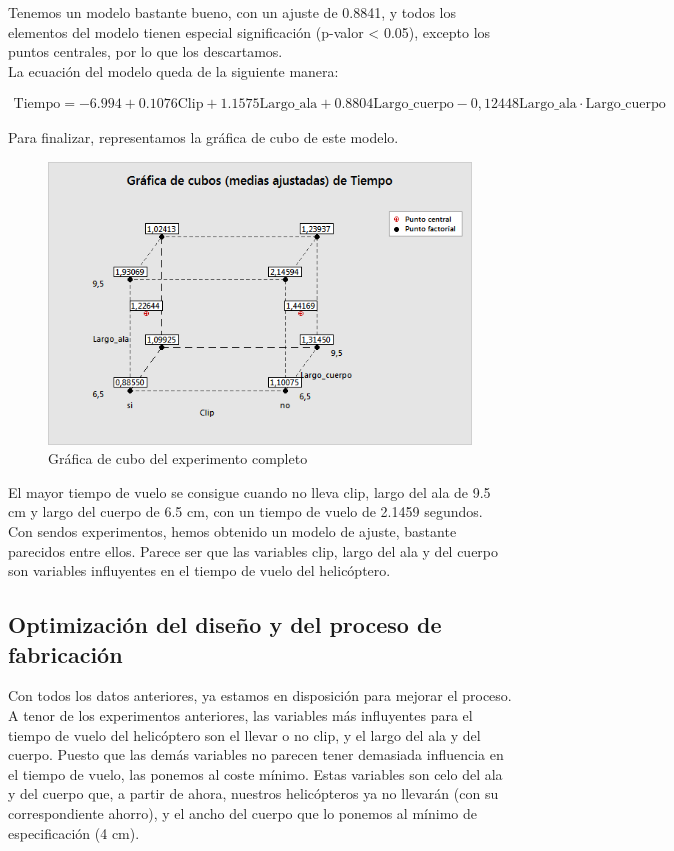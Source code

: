 \documentclass[12pt,a4paper,twoside,openright,titlepage,final]{article}
\begin{document}
Tenemos un modelo bastante bueno, con un ajuste de 0.8841, y todos los elementos del modelo tienen especial significación (p-valor < 0.05), excepto los puntos centrales, por lo que los descartamos.\\

La ecuación del modelo queda de la siguiente manera:

\begin{multline*}
\text{Tiempo} = -6.994 + 0.1076 \text{Clip} + 1.1575 \text{Largo\_ala} + 0.8804 \text{Largo\_cuerpo} - 0,12448 \text{Largo\_ala}\cdot \text{Largo\_cuerpo}
\end{multline*}

Para finalizar, representamos la gráfica de cubo de este modelo.\\

\begin{figure}[htbp!]
	\centering
	\includegraphics[width=0.7\linewidth]{imagenes/Experimento_completo/Grafica_de_cubos_(medias_ajustadas)_de_Tiempo}
	\caption{Gráfica de cubo del experimento completo}
	\label{fig:cubo_completo}
\end{figure}

El mayor tiempo de vuelo se consigue cuando no lleva clip, largo del ala de 9.5 cm y largo del cuerpo de 6.5 cm, con un tiempo de vuelo de 2.1459 segundos.\\

Con sendos experimentos, hemos obtenido un modelo de ajuste, bastante parecidos entre ellos. Parece ser que las variables clip, largo del ala y del cuerpo son variables influyentes en el tiempo de vuelo del helicóptero.

\subsection{Optimización del diseño y del proceso de fabricación}

Con todos los datos anteriores, ya estamos en disposición para mejorar el proceso. A tenor de los experimentos anteriores, las variables más influyentes para el tiempo de vuelo del helicóptero son el llevar o no clip, y el largo del ala y del cuerpo. Puesto que las demás variables no parecen tener demasiada influencia en el tiempo de vuelo, las ponemos al coste mínimo. Estas variables son celo del ala y del cuerpo que, a partir de ahora, nuestros helicópteros ya no llevarán (con su correspondiente ahorro), y el ancho del cuerpo que lo ponemos al mínimo de especificación (4 cm).\\
\end{document}
